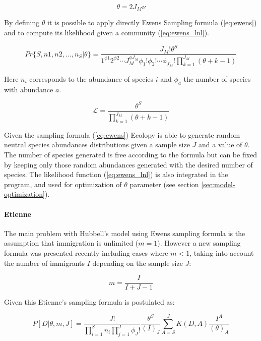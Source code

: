 \begin{equation} \label{eq:theta}
\theta = 2J_M\nu
\end{equation}

By defining $\theta$ it is possible to apply directly Ewens Sampling formula (\ref{eq:ewens}) and to compute its likelihood given a community (\ref{eq:ewens_lnl}).

\begin{equation} \label{eq:ewens}
Pr\{S,n1,n2,\ldots,n_S|\theta\} = \frac{J_M!\theta^S}{1^{\phi1} 2^{\phi2} \cdots J_M^{\phi J_M} \phi_1! \phi_2! \cdots \phi_{J_M}! \prod_{k=1}^{J_M} (\theta + k - 1)}
\end{equation}

Here $n_i$ corresponds to the abundance of species $i$ and $\phi_a$ the number of species with abundance $a$.

\begin{equation} \label{eq:ewens_lnl}
\mathcal{L} = \frac{\theta^S}{\prod_{k=1}^{J_M} (\theta + k - 1)}
\end{equation}

Given the sampling formula (\ref{eq:ewens}) Ecolopy is able to generate random neutral species abundances distributions given a sample size $J$ and a value of $\theta$. The number of species generated is free according to the formula but can be fixed by keeping only those random abundances generated with the desired number of species. The likelihood function (\ref{eq:ewens_lnl}) is also integrated in the program, and used for optimization of $\theta$ parameter (see section \ref{sec:model-optimization}).

\paragraph{Etienne}
\label{sec:etienne-model}

The main problem with Hubbell's model using Ewens sampling formula is the assumption that immigration is unlimited ($m=1$). However a new sampling formula was presented recently \cite{Etienne2005} including cases where $m<1$, taking into account the number of immigrants $I$ depending on the sample size $J$:

\begin{equation} \label{eq:m}
m = \frac{I}{I+J-1}
\end{equation}

Given this Etienne's sampling formula is postulated as:

\begin{equation} \label{eq:etienne}
P[D|\theta,m,J] = \frac{J!}{\prod_{i=1}^Sn_i \prod_{j=1}^J\phi_J!} \frac{\theta^S}{(I)_J} \sum_{A=S}^JK(D,A) \frac{I^A}{(\theta)_A}
\end{equation}

